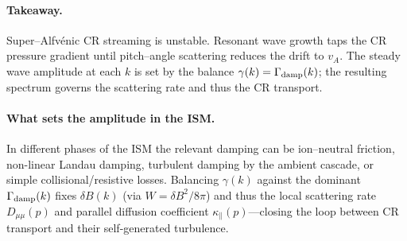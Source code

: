 \paragraph{Takeaway.}
Super–Alfv\'enic CR streaming is unstable. Resonant wave growth taps the CR pressure
gradient until pitch–angle scattering reduces the drift to \(v_A\). The steady wave
amplitude at each \(k\) is set by the balance \(\gamma(k)=\Gamma_{\rm damp}(k)\); the
resulting spectrum governs the scattering rate and thus the CR transport.

\paragraph{What sets the amplitude in the ISM.}
In different phases of the ISM the relevant damping can be ion–neutral friction, non-linear Landau damping, turbulent damping by the ambient cascade, or simple collisional/resistive losses.
Balancing $\gamma(k)$ against the dominant $\Gamma_{\rm damp}(k)$ fixes $\delta B(k)$ (via $W=\delta B^2/8\pi$) and thus the local scattering rate $D_{\mu\mu}(p)$ and parallel diffusion coefficient $\kappa_\parallel(p)$—closing the loop between CR transport and their self-generated turbulence.



